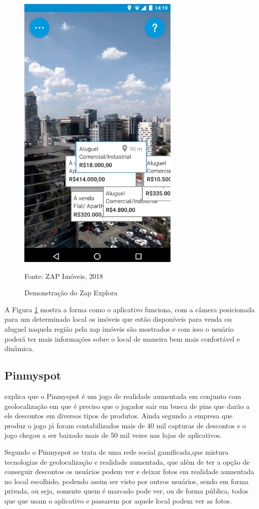 	\begin{figure}[H]
		\centering
		\includegraphics[scale=0.6]{imagens/zapexplora}
		\caption{Demonstração do Zap Explora}
		Fonte: ZAP Imóveis, 2018
		\label{fig:zap} 
	\end{figure}
	
	A Figura \ref{fig:zap} mostra a forma como o aplicativo funciona, com a câmera posicionada para um determinado local os imóveis que estão disponíveis para venda ou aluguel naquela região pela zap imóveis são mostrados e com isso o usuário poderá ter mais informações sobre o local de maneira bem mais confortável e dinâmica.
	
	\subsection{Pinmyspot}
	 explica que o Pinmyspot é um jogo de realidade aumentada em conjunto com geolocalização em que é preciso que o jogador sair em busca de pins que darão a ele descontos em diversos tipos de produtos. Ainda segundo a empresa que produz o jogo  já foram contabilizados mais de 40 mil capturas de descontos e o jogo chegou a ser baixado mais de 50 mil vezes nas lojas de aplicativos.
	
	Segundo  o Pinmyspot se trata de uma rede social gamificada,que mistura tecnologias de geolocalização e realidade aumentada, que além de ter a opção de conseguir descontos os usuários podem ver e deixar fotos em realidade aumentada no local escolhido, podendo assim ser visto por outros usuários, sendo em forma privada, ou seja, somente quem é marcado pode ver, ou de forma pública, todos que que usam o aplicativo e passarem por aquele local podem ver as fotos.
	
